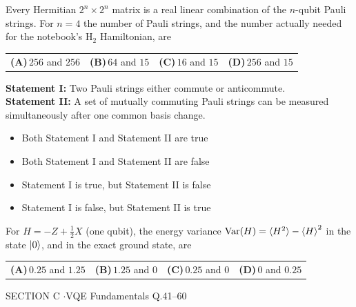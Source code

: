 \documentclass[11pt,a4paper]{article}
\newcommand{\optlabel}[1]{\textbf{(#1)}}
\newenvironment{qitem}[1]{\begin{list}{}{\setlength{\leftmargin}{3.3em}\setlength{\labelwidth}{3.1em}%
  \setlength{\labelsep}{0.2em}\setlength{\topsep}{3pt}\setlength{\parsep}{3pt}}\item[\textbf{Q.#1}\hfill]}{\end{list}}
\newcommand{\qsep}{\par\vspace{2pt}{\color{black!15}\hrule}\vspace{4pt}}
\begin{document}
\begin{qitem}{38}
Every Hermitian $2^n\times2^n$ matrix is a real linear combination of the $n$-qubit Pauli strings. For $n = 4$ the number of Pauli strings,
and the number actually needed for the notebook's H$_2$ Hamiltonian, are
\par\smallskip\noindent\begin{tabularx}{\linewidth}{@{}*{4}{L}@{}}
\optlabel{A}\,$256$ and $256$ & \optlabel{B}\,$64$ and $15$ & \optlabel{C}\,$16$ and $15$ & \optlabel{D}\,$256$ and $15$
\end{tabularx}
\end{qitem}
\qsep

\begin{qitem}{39}
\textbf{Statement I:} Two Pauli strings either commute or anticommute.\\[1mm]
\textbf{Statement II:} A set of mutually commuting Pauli strings can be measured simultaneously after one common basis change.
\begin{itemize}[leftmargin=2.6em, labelsep=0.4em, itemsep=2pt, topsep=3pt]
\item[\optlabel{A}] Both Statement I and Statement II are true
\item[\optlabel{B}] Both Statement I and Statement II are false
\item[\optlabel{C}] Statement I is true, but Statement II is false
\item[\optlabel{D}] Statement I is false, but Statement II is true
\end{itemize}
\end{qitem}
\qsep

\begin{qitem}{40}
For $H = -Z + \tfrac12X$ (one qubit), the energy variance $\mathrm{Var}(H) = \braket{H^2} - \braket H^2$ in the state $\ket0$, and in the exact ground state, are
\par\smallskip\noindent\begin{tabularx}{\linewidth}{@{}*{4}{L}@{}}
\optlabel{A}\,$0.25$ and $1.25$ & \optlabel{B}\,$1.25$ and $0$ & \optlabel{C}\,$0.25$ and $0$ & \optlabel{D}\,$0$ and $0.25$
\end{tabularx}
\end{qitem}
\qsep

\newpage

\begin{sectionbanner}SECTION C \enspace$\cdot$\enspace VQE Fundamentals \hfill Q.41--60\end{sectionbanner}
\end{document}
